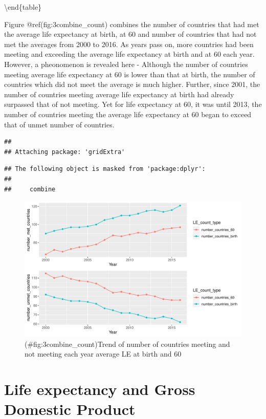 \documentclass[11pt,a4paper,]{article}
\begin{document}
\textbackslash{}end\{table\}

Figure @ref(fig:3combine\_count) combines the number of countries that had met the average life expectancy at birth, at 60 and number of countries that had not met the averages from 2000 to 2016. As years pass on, more countries had been meeting and exceeding the average life expectancy at birth and at 60 each year. However, a pheonomenon is revealed here - Although the number of countries meeting average life expectancy at 60 is lower than that at birth, the number of countries which did not meet the average is much higher. Further, since 2001, the number of countries meeting average life expectancy at birth had already surpassed that of not meeting. Yet for life expectancy at 60, it was until 2013, the number of countries meeting the average life expectancy at 60 began to exceed that of unmet number of countries.

\begin{verbatim}
## 
## Attaching package: 'gridExtra'
\end{verbatim}

\begin{verbatim}
## The following object is masked from 'package:dplyr':
## 
##     combine
\end{verbatim}

\begin{figure}
\centering
\includegraphics{ETC5513-assignment4_files/figure-latex/3combine_count-1.pdf}
\caption{(\#fig:3combine\_count)Trend of number of countries meeting and not meeting each year average LE at birth and 60}
\end{figure}

\section*{Life expectancy and Gross Domestic Product}

\printbibliography
\end{document}
